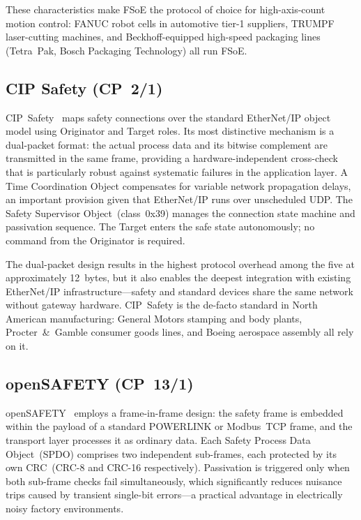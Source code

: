 \documentclass[conference]{IEEEtran}
\begin{document}
These characteristics make FSoE the protocol of choice for high-axis-count
motion control: FANUC robot cells in automotive tier-1 suppliers, TRUMPF
laser-cutting machines, and Beckhoff-equipped high-speed packaging lines
(Tetra~Pak, Bosch Packaging Technology) all run FSoE.

\subsection{CIP Safety (CP~2/1)}

CIP~Safety~\cite{IEC617843,ODVACIPSafety} maps safety connections over the
standard EtherNet/IP object model using Originator and Target roles.
Its most distinctive mechanism is a dual-packet format: the actual process
data and its bitwise complement are transmitted in the same frame, providing
a hardware-independent cross-check that is particularly robust against
systematic failures in the application layer. A Time Coordination Object
compensates for variable network propagation delays, an important provision
given that EtherNet/IP runs over unscheduled UDP. The Safety Supervisor
Object~(class~0x39) manages the connection state machine and passivation
sequence. The Target enters the safe state autonomously; no command
from the Originator is required.

The dual-packet design results in the highest protocol overhead among the
five at approximately 12~bytes, but it also enables the deepest integration
with existing EtherNet/IP infrastructure---safety and standard devices
share the same network without gateway hardware. CIP~Safety is the
de-facto standard in North American manufacturing: General Motors stamping
and body plants, Procter~\&~Gamble consumer goods lines, and Boeing
aerospace assembly all rely on it.

\subsection{openSAFETY (CP~13/1)}

openSAFETY~\cite{IEC617843,EPSGopenSAFETY} employs a frame-in-frame
design: the safety frame is embedded within the payload of a standard
POWERLINK or Modbus~TCP frame, and the transport layer processes it as
ordinary data. Each Safety Process Data Object~(SPDO) comprises two
independent sub-frames, each protected by its own CRC~(CRC-8 and CRC-16
respectively). Passivation is triggered only when both sub-frame checks
fail simultaneously, which significantly reduces nuisance trips caused by
transient single-bit errors---a practical advantage in electrically noisy
factory environments.
\end{document}
